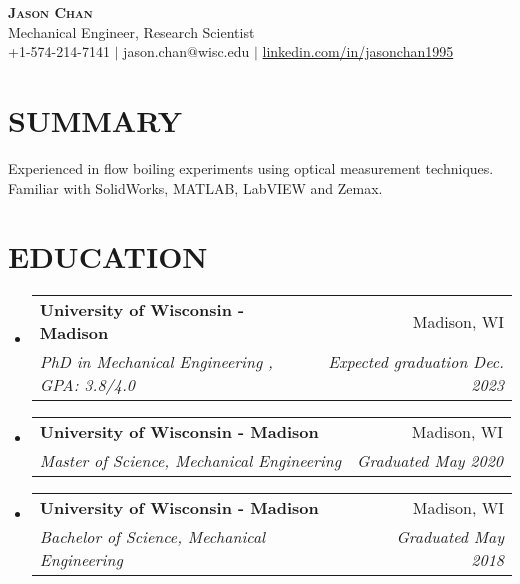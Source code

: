 \documentclass[letterpaper,11pt]{article}
\makeatletter
\newcommand{\GPA}[1]{%
  , GPA: #1/4.0
}
\newcommand{\resumeSubheading}[4]{
  \vspace{-1pt}\item
    \begin{tabular*}{0.97\textwidth}[t]{l@{\extracolsep{\fill}}r}
      \textbf{#1} & #2 \\
      \textit{\small#3} & \textit{\small #4} \\
    \end{tabular*}\vspace{-7pt}
}
\newcommand{\resumeSubHeadingListStart}{\begin{itemize}[leftmargin=0.15in, label={}]}
\newcommand{\resumeSubHeadingListEnd}{\end{itemize}}
\makeatother
\begin{document}


\begin{center}
    \textbf{\LARGE \scshape Jason Chan} \\
    \vspace{1mm}
    Mechanical Engineer, Research Scientist\\ %
    \small +1-574-214-7141  $|$ jason.chan$@$wisc.edu $|$ \href{https://www.linkedin.com/in/jasonchan1995}{linkedin.com/in/jasonchan1995}
\end{center}
\section{SUMMARY}
\begin{comment}
Experienced in design, analysis, and verification of optical and mechanical systems in multiphase fluids research.
\end{comment}
Experienced in flow boiling experiments using optical measurement techniques. Familiar with SolidWorks, MATLAB, LabVIEW and Zemax.%
\begin{comment}
~Familiar with Raman spectroscopy in sample structure analysis.
\end{comment}
\begin{comment}
Familiar with SolidWorks, MATLAB, and LabVIEW for structural and thermal simulation, experiment and analysis.
\end{comment}

\section{EDUCATION}
    \resumeSubHeadingListStart
      \resumeSubheading
       {University of Wisconsin - Madison}{Madison, WI}
       {PhD in Mechanical Engineering\GPA{3.8}}{Expected graduation Dec. 2023}
    
      \resumeSubheading
        {University of Wisconsin - Madison}{Madison, WI}
        {Master of Science, Mechanical Engineering}{Graduated May 2020}
      
      \resumeSubheading
        {University of Wisconsin - Madison}{Madison, WI}
        {Bachelor of Science, Mechanical Engineering}{Graduated May 2018}
\resumeSubHeadingListEnd
\end{document}
